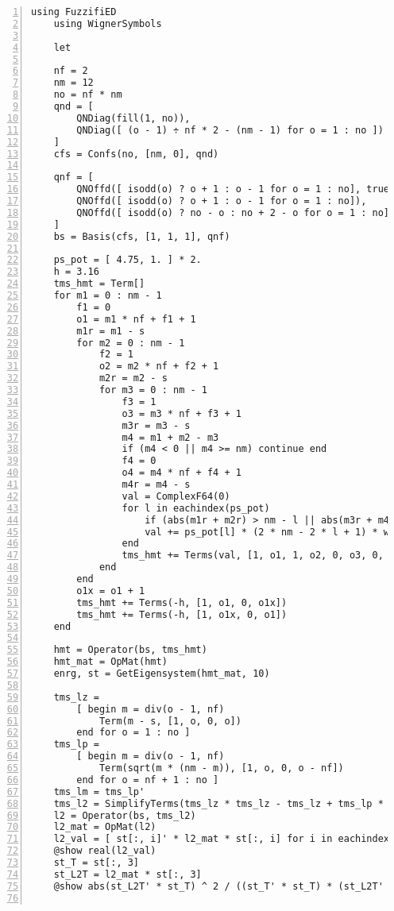 \documentclass{timesjhep}
\begin{document}
\begin{lstlisting}[numbers=left]
    using FuzzifiED
    using WignerSymbols

    let

    nf = 2
    nm = 12
    no = nf * nm
    qnd = [ 
        QNDiag(fill(1, no)), 
        QNDiag([ (o - 1) ÷ nf * 2 - (nm - 1) for o = 1 : no ])
    ]
    cfs = Confs(no, [nm, 0], qnd)

    qnf = [ 
        QNOffd([ isodd(o) ? o + 1 : o - 1 for o = 1 : no], true, ComplexF64[ isodd(o) ? -1 : 1 for o = 1 : no]),
        QNOffd([ isodd(o) ? o + 1 : o - 1 for o = 1 : no]),
        QNOffd([ isodd(o) ? no - o : no + 2 - o for o = 1 : no], ComplexF64(-1) .^ (collect(0 : nm * nf - 1) .÷ nf))
    ]
    bs = Basis(cfs, [1, 1, 1], qnf) 

    ps_pot = [ 4.75, 1. ] * 2.
    h = 3.16
    tms_hmt = Term[]
    for m1 = 0 : nm - 1
        f1 = 0
        o1 = m1 * nf + f1 + 1
        m1r = m1 - s
        for m2 = 0 : nm - 1
            f2 = 1
            o2 = m2 * nf + f2 + 1
            m2r = m2 - s
            for m3 = 0 : nm - 1
                f3 = 1
                o3 = m3 * nf + f3 + 1
                m3r = m3 - s
                m4 = m1 + m2 - m3 
                if (m4 < 0 || m4 >= nm) continue end
                f4 = 0
                o4 = m4 * nf + f4 + 1
                m4r = m4 - s
                val = ComplexF64(0)
                for l in eachindex(ps_pot)
                    if (abs(m1r + m2r) > nm - l || abs(m3r + m4r) > nm - l) break end 
                    val += ps_pot[l] * (2 * nm - 2 * l + 1) * wigner3j(s, s, nm - l, m1r, m2r, -m1r - m2r) * wigner3j(s, s, nm - l, m4r, m3r, -m3r - m4r)
                end 
                tms_hmt += Terms(val, [1, o1, 1, o2, 0, o3, 0, o4])
            end
        end
        o1x = o1 + 1
        tms_hmt += Terms(-h, [1, o1, 0, o1x])
        tms_hmt += Terms(-h, [1, o1x, 0, o1])
    end

    hmt = Operator(bs, tms_hmt)
    hmt_mat = OpMat(hmt)
    enrg, st = GetEigensystem(hmt_mat, 10)

    tms_lz = 
        [ begin m = div(o - 1, nf)
            Term(m - s, [1, o, 0, o])
        end for o = 1 : no ]
    tms_lp = 
        [ begin m = div(o - 1, nf)
            Term(sqrt(m * (nm - m)), [1, o, 0, o - nf])
        end for o = nf + 1 : no ]
    tms_lm = tms_lp' 
    tms_l2 = SimplifyTerms(tms_lz * tms_lz - tms_lz + tms_lp * tms_lm)
    l2 = Operator(bs, tms_l2)
    l2_mat = OpMat(l2)
    l2_val = [ st[:, i]' * l2_mat * st[:, i] for i in eachindex(enrg)]
    @show real(l2_val)
    st_T = st[:, 3]
    st_L2T = l2_mat * st[:, 3]
    @show abs(st_L2T' * st_T) ^ 2 / ((st_T' * st_T) * (st_L2T' * st_L2T))


\end{lstlisting}
\end{document}
